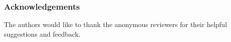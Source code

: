 \documentclass[runningheads]{llncs}
\begin{document}
\maketitle

\begin{abstract}

\end{abstract}









\sloppy  %

\setcounter{footnote}{0}
\newcommand{\la}{\leftarrow}



%










\subsubsection*{Acknowledgements}
The authors would like to thank the anonymous reviewers for their helpful suggestions and feedback.


\begin{footnotesize}
%


\end{footnotesize}
%
\end{document}
